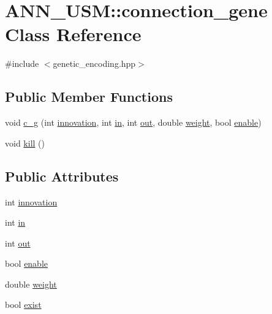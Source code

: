 \hypertarget{class_a_n_n___u_s_m_1_1connection__gene}{\section{A\-N\-N\-\_\-\-U\-S\-M\-:\-:connection\-\_\-gene Class Reference}
\label{class_a_n_n___u_s_m_1_1connection__gene}
}


{\ttfamily \#include $<$genetic\-\_\-encoding.\-hpp$>$}

\subsection*{Public Member Functions}
\begin{DoxyCompactItemize}
\item 
void \hyperlink{class_a_n_n___u_s_m_1_1connection__gene_a48a26d3795acd28e5448a2f542289729}{c\-\_\-g} (int \hyperlink{class_a_n_n___u_s_m_1_1connection__gene_acd19e4cadbac4ef5aa4ae0b7aa3ae5c2}{innovation}, int \hyperlink{class_a_n_n___u_s_m_1_1connection__gene_a5100dadf9e141335a47230003303f2d2}{in}, int \hyperlink{class_a_n_n___u_s_m_1_1connection__gene_abc6a5dafbfa3133efc876c8f0f762dd6}{out}, double \hyperlink{class_a_n_n___u_s_m_1_1connection__gene_a12dddd6cd3c0c5b9749015cc1c81e480}{weight}, bool \hyperlink{class_a_n_n___u_s_m_1_1connection__gene_ae875a9ba44fa1c534a6e799d4ca64399}{enable})
\item 
void \hyperlink{class_a_n_n___u_s_m_1_1connection__gene_aa1d7dbb4900169b5b20428188e4f38ff}{kill} ()
\end{DoxyCompactItemize}
\subsection*{Public Attributes}
\begin{DoxyCompactItemize}
\item 
int \hyperlink{class_a_n_n___u_s_m_1_1connection__gene_acd19e4cadbac4ef5aa4ae0b7aa3ae5c2}{innovation}
\item 
int \hyperlink{class_a_n_n___u_s_m_1_1connection__gene_a5100dadf9e141335a47230003303f2d2}{in}
\item 
int \hyperlink{class_a_n_n___u_s_m_1_1connection__gene_abc6a5dafbfa3133efc876c8f0f762dd6}{out}
\item 
bool \hyperlink{class_a_n_n___u_s_m_1_1connection__gene_ae875a9ba44fa1c534a6e799d4ca64399}{enable}
\item 
double \hyperlink{class_a_n_n___u_s_m_1_1connection__gene_a12dddd6cd3c0c5b9749015cc1c81e480}{weight}
\item 
bool \hyperlink{class_a_n_n___u_s_m_1_1connection__gene_afe8be67cb9aaffbe9015729fbcfe84f9}{exist}
\end{DoxyCompactItemize}


